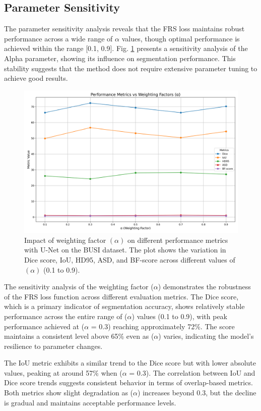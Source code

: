 \documentclass[review]{elsarticle}
\begin{document}
\subsection{Parameter Sensitivity}
The parameter sensitivity analysis reveals that the FRS loss maintains robust performance across a wide range of \(\alpha\) values, though optimal performance is achieved within the range [0.1, 0.9]. Fig. \ref{fig:alpha_sen} presents a sensitivity analysis of the Alpha parameter, showing its influence on segmentation performance. This stability suggests that the method does not require extensive parameter tuning to achieve good results.
\begin{figure}[H]
    \centering
    \includegraphics[width=\textwidth]{alpha_sensitivity.png}
    \caption{Impact of weighting factor $(\alpha)$ on different performance metrics with U-Net on the BUSI dataset. The plot shows the variation in Dice score, IoU, HD95, ASD, and BF-score across different values of $(\alpha)$ (0.1 to 0.9).}
    \label{fig:alpha_sen}
\end{figure}
The sensitivity analysis of the weighting factor (\(\alpha\)) demonstrates the robustness of the FRS loss function across different evaluation metrics. The Dice score, which is a primary indicator of segmentation accuracy, shows relatively stable performance across the entire range of (\(\alpha\)) values (0.1 to 0.9), with peak performance achieved at (\(\alpha\) = 0.3) reaching approximately 72\%. The score maintains a consistent level above 65\% even as (\(\alpha\)) varies, indicating the model's resilience to parameter changes.

The IoU metric exhibits a similar trend to the Dice score but with lower absolute values, peaking at around 57\% when (\(\alpha\) = 0.3). The correlation between IoU and Dice score trends suggests consistent behavior in terms of overlap-based metrics. Both metrics show slight degradation as (\(\alpha\)) increases beyond 0.3, but the decline is gradual and maintains acceptable performance levels.
\end{document}
